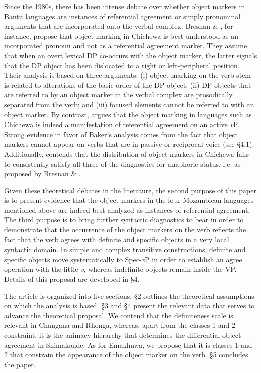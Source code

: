 \documentclass[output=paper]{langsci/langscibook}
\begin{document}
Since the 1980s, there has been intense debate over whether object markers in Bantu languages are instances of referential agreement or simply pronominal arguments that are incorporated onto the verbal complex. Bresnan \& \citet{Mchombo1987}, for instance, propose that object marking in Chichewa is best understood as an incorporated pronoun and not as a referential agreement marker. They assume that when an overt lexical DP co-occurs with the object marker, the latter signals that the DP object has been dislocated to a right or left-peripheral position. Their analysis is based on three arguments: (i) object marking on the verb stem is related to alterations of the basic order of the DP object; (ii) DP objects that are referred to by an object marker in the verbal complex are prosodically separated from the verb; and (iii) focused elements cannot be referred to with an object marker. By contrast, \citet{Baker2008} argues that the object marking in languages such as Chichewa is indeed a manifestation of referential agreement on an active {\textit{v}}P. Strong evidence in favor of Baker’s analysis comes from the fact that object markers cannot appear on verbs that are in passive or reciprocal voice (see §4.1). Additionally, \citet{Downing2014} contends that the distribution of object markers in Chichewa fails to consistently satisfy all three of the diagnostics for anaphoric status, i.e. as proposed by Bresnan \& \citet{Mchombo1987}.

Given these theoretical debates in the literature, the second purpose of this paper is to present evidence that the object markers in the four Mozambican languages mentioned above are indeed best analyzed as instances of referential agreement. The third purpose is to bring further syntactic diagnostics to bear in order to demonstrate that the occurrence of the object markers on the verb reflects the fact that the verb agrees with definite and specific objects in a very local syntactic domain. In simple and complex transitive constructions, definite and specific objects move systematically to Spec-\textit{v}P in order to establish an agree operation with the little {\textit{v}}, whereas indefinite objects remain inside the VP. Details of this proposal are developed in §4.

The article is organized into five sections. §2 outlines the theoretical assumptions on which the analysis is based. §3 and §4 present the relevant data that serves to advance the theoretical proposal. We contend that the definiteness scale is relevant in Changana and Rhonga, whereas, apart from the classes 1 and 2 constraint, it is the animacy hierarchy that determines the differential object agreement in Shimakonde. As for Emakhuwa, we propose that it is classes 1 and 2 that constrain the appearance of the object marker on the verb. §5 concludes the paper.
\end{document}
